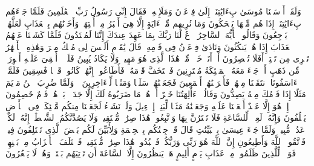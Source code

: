 وَلَقَدۡ أَرۡسَلۡنَا مُوسَىٰ بِءَایَٰتِنَاۤ إِلَىٰ فِرۡعَوۡنَ وَمَلَإِی۟هِۦ فَقَالَ إِنِّی رَسُولُ رَبِّ ٱلۡعَٰلَمِینَ%
\stopbuffer
\startbuffer[\q:43:47]
فَلَمَّا جَاۤءَهُم بِءَایَٰتِنَاۤ إِذَا هُم مِّنۡهَا یَضۡحَكُونَ%
\stopbuffer
\startbuffer[\q:43:48]
وَمَا نُرِیهِم مِّنۡ ءَایَةٍ إِلَّا هِیَ أَكۡبَرُ مِنۡ أُخۡتِهَاۖ وَأَخَذۡنَٰهُم بِٱلۡعَذَابِ لَعَلَّهُمۡ یَرۡجِعُونَ%
\stopbuffer
\startbuffer[\q:43:49]
وَقَالُوا۟ یَٰۤأَیُّهَ ٱلسَّاحِرُ ٱدۡعُ لَنَا رَبَّكَ بِمَا عَهِدَ عِندَكَ إِنَّنَا لَمُهۡتَدُونَ%
\stopbuffer
\startbuffer[\q:43:50]
فَلَمَّا كَشَفۡنَا عَنۡهُمُ ٱلۡعَذَابَ إِذَا هُمۡ یَنكُثُونَ%
\stopbuffer
\startbuffer[\q:43:51]
وَنَادَىٰ فِرۡعَوۡنُ فِی قَوۡمِهِۦ قَالَ یَٰقَوۡمِ أَلَیۡسَ لِی مُلۡكُ مِصۡرَ وَهَٰذِهِ ٱلۡأَنۡهَٰرُ تَجۡرِی مِن تَحۡتِیۤۚ أَفَلَا تُبۡصِرُونَ%
\stopbuffer
\startbuffer[\q:43:52]
أَمۡ أَنَا۠ خَیۡرࣱ مِّنۡ هَٰذَا ٱلَّذِی هُوَ مَهِینࣱ وَلَا یَكَادُ یُبِینُ%
\stopbuffer
\startbuffer[\q:43:53]
فَلَوۡلَاۤ أُلۡقِیَ عَلَیۡهِ أَسۡوِرَةࣱ مِّن ذَهَبٍ أَوۡ جَاۤءَ مَعَهُ ٱلۡمَلَٰۤئِكَةُ مُقۡتَرِنِینَ%
\stopbuffer
\startbuffer[\q:43:54]
فَٱسۡتَخَفَّ قَوۡمَهُۥ فَأَطَاعُوهُۚ إِنَّهُمۡ كَانُوا۟ قَوۡمࣰا فَٰسِقِینَ%
\stopbuffer
\startbuffer[\q:43:55]
فَلَمَّاۤ ءَاسَفُونَا ٱنتَقَمۡنَا مِنۡهُمۡ فَأَغۡرَقۡنَٰهُمۡ أَجۡمَعِینَ%
\stopbuffer
\startbuffer[\q:43:56]
فَجَعَلۡنَٰهُمۡ سَلَفࣰا وَمَثَلࣰا لِّلۡءَاخِرِینَ%
\stopbuffer
\startbuffer[\q:43:57]
۞ وَلَمَّا ضُرِبَ ٱبۡنُ مَرۡیَمَ مَثَلًا إِذَا قَوۡمُكَ مِنۡهُ یَصِدُّونَ%
\stopbuffer
\startbuffer[\q:43:58]
وَقَالُوۤا۟ ءَأَٰلِهَتُنَا خَیۡرٌ أَمۡ هُوَۚ مَا ضَرَبُوهُ لَكَ إِلَّا جَدَلَۢاۚ بَلۡ هُمۡ قَوۡمٌ خَصِمُونَ%
\stopbuffer
\startbuffer[\q:43:59]
إِنۡ هُوَ إِلَّا عَبۡدٌ أَنۡعَمۡنَا عَلَیۡهِ وَجَعَلۡنَٰهُ مَثَلࣰا لِّبَنِیۤ إِسۡرَٰۤءِیلَ%
\stopbuffer
\startbuffer[\q:43:60]
وَلَوۡ نَشَاۤءُ لَجَعَلۡنَا مِنكُم مَّلَٰۤئِكَةࣰ فِی ٱلۡأَرۡضِ یَخۡلُفُونَ%
\stopbuffer
\startbuffer[\q:43:61]
وَإِنَّهُۥ لَعِلۡمࣱ لِّلسَّاعَةِ فَلَا تَمۡتَرُنَّ بِهَا وَٱتَّبِعُونِۚ هَٰذَا صِرَٰطࣱ مُّسۡتَقِیمࣱ%
\stopbuffer
\startbuffer[\q:43:62]
وَلَا یَصُدَّنَّكُمُ ٱلشَّیۡطَٰنُۖ إِنَّهُۥ لَكُمۡ عَدُوࣱّ مُّبِینࣱ%
\stopbuffer
\startbuffer[\q:43:63]
وَلَمَّا جَاۤءَ عِیسَىٰ بِٱلۡبَیِّنَٰتِ قَالَ قَدۡ جِئۡتُكُم بِٱلۡحِكۡمَةِ وَلِأُبَیِّنَ لَكُم بَعۡضَ ٱلَّذِی تَخۡتَلِفُونَ فِیهِۖ فَٱتَّقُوا۟ ٱللَّهَ وَأَطِیعُونِ%
\stopbuffer
\startbuffer[\q:43:64]
إِنَّ ٱللَّهَ هُوَ رَبِّی وَرَبُّكُمۡ فَٱعۡبُدُوهُۚ هَٰذَا صِرَٰطࣱ مُّسۡتَقِیمࣱ%
\stopbuffer
\startbuffer[\q:43:65]
فَٱخۡتَلَفَ ٱلۡأَحۡزَابُ مِنۢ بَیۡنِهِمۡۖ فَوَیۡلࣱ لِّلَّذِینَ ظَلَمُوا۟ مِنۡ عَذَابِ یَوۡمٍ أَلِیمٍ%
\stopbuffer
\startbuffer[\q:43:66]
هَلۡ یَنظُرُونَ إِلَّا ٱلسَّاعَةَ أَن تَأۡتِیَهُم بَغۡتَةࣰ وَهُمۡ لَا یَشۡعُرُونَ%
